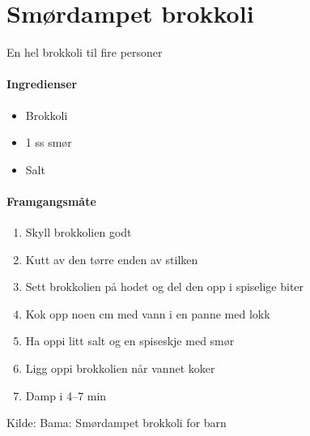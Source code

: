 \section{Smørdampet brokkoli}
\label{brokkoli}
En hel brokkoli til fire personer

\paragraph{Ingredienser}
\begin{itemize}[noitemsep]
	\item Brokkoli
	\item 1 ss smør
	\item Salt
\end{itemize}

\paragraph{Framgangsmåte}
\begin{enumerate}[noitemsep]
	\item Skyll brokkolien godt
	\item Kutt av den tørre enden av stilken
	\item Sett brokkolien på hodet og del den opp i spiselige biter
	\item Kok opp noen cm med vann i en panne med lokk
	\item Ha oppi litt salt og en spiseskje med smør
	\item Ligg oppi brokkolien når vannet koker
	\item Damp i 4--7 min
\end{enumerate}

Kilde: Bama: Smørdampet brokkoli for barn
